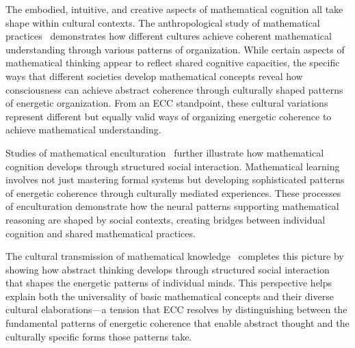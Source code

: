 The embodied, intuitive, and creative aspects of mathematical cognition all take shape within cultural contexts. The anthropological study of mathematical practices~\cite{Ascher1991, van2025processes} demonstrates how different cultures achieve coherent mathematical understanding through various patterns of organization. While certain aspects of mathematical thinking appear to reflect shared cognitive capacities, the specific ways that different societies develop mathematical concepts reveal how consciousness can achieve abstract coherence through culturally shaped patterns of energetic organization. From an ECC standpoint, these cultural variations represent different but equally valid ways of organizing energetic coherence to achieve mathematical understanding.

Studies of mathematical enculturation~\cite{Lloyd1990, butlin2023consciousnessartificialintelligenceinsights} further illustrate how mathematical cognition develops through structured social interaction. Mathematical learning involves not just mastering formal systems but developing sophisticated patterns of energetic coherence through culturally mediated experiences. These processes of enculturation demonstrate how the neural patterns supporting mathematical reasoning are shaped by social contexts, creating bridges between individual cognition and shared mathematical practices.

The cultural transmission of mathematical knowledge~\cite{Sperber1996, zheng2025unbearable} completes this picture by showing how abstract thinking develops through structured social interaction that shapes the energetic patterns of individual minds. This perspective helps explain both the universality of basic mathematical concepts and their diverse cultural elaborations—a tension that ECC resolves by distinguishing between the fundamental patterns of energetic coherence that enable abstract thought and the culturally specific forms those patterns take.

